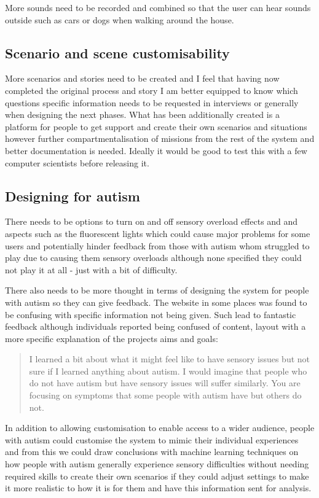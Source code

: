 More sounds need to be recorded and combined so that the user can hear sounds outside such as cars or dogs when walking around the house. 



\subsection{Scenario and scene customisability}
More scenarios and stories need to be created and I feel that having now completed the original process and story I am better equipped to know which questions specific information needs to be requested in interviews or generally when designing the next phases. What has been additionally created is a platform for people to get support and create their own scenarios and situations however further compartmentalisation of missions from the rest of the system and better documentation is needed. Ideally it would be good to test this with a few computer scientists before releasing it.

\subsection{Designing for autism}
There needs to be options to turn on and off sensory overload effects and and aspects such as the fluorescent lights which could cause major problems for some users and  potentially hinder feedback from those with autism whom struggled to play due to causing them sensory overloads although none specified they could not play it at all - just with a bit of difficulty. 

There also needs to be more thought in terms of designing the system for people with autism so they can give feedback. The website in some places was found to be confusing with specific information not being given. Such lead to fantastic feedback although individuals reported being confused of content, layout with a more specific explanation of the projects aims and goals:

\begin{quote}
I learned a bit about what it might feel like to have sensory issues but not sure if I learned anything about autism. I would imagine that people who do not have autism but have sensory issues will suffer similarly. You are focusing on symptoms that some people with autism have but others do not.
\end{quote}

In addition to allowing customisation to enable access to a wider audience, people with autism could customise the system to mimic their individual experiences and from this we could draw conclusions with machine learning techniques on how people with autism generally experience sensory difficulties without needing required skills to create their own scenarios if they could adjust settings to make it more realistic to how it is for them and have this information sent for analysis.

